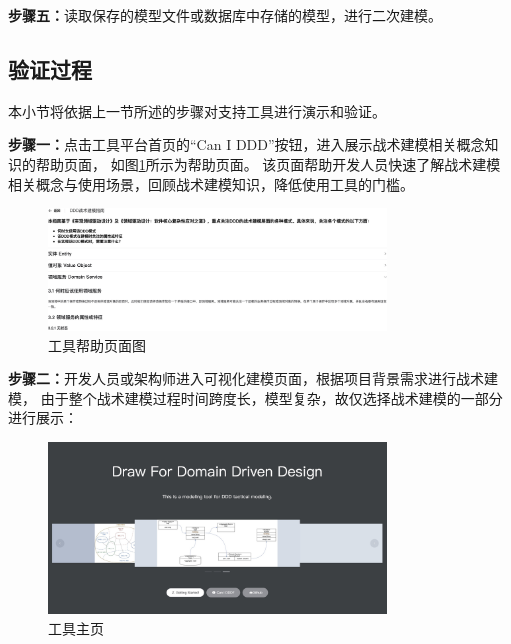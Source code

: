 \textbf{步骤五：}读取保存的模型文件或数据库中存储的模型，进行二次建模。

\subsection{验证过程}

本小节将依据上一节所述的步骤对支持工具进行演示和验证。

\textbf{步骤一：}点击工具平台首页的“Can I DDD”按钮，进入展示战术建模相关概念知识的帮助页面，
如图\ref{modelknowledge}所示为帮助页面。
该页面帮助开发人员快速了解战术建模相关概念与使用场景，回顾战术建模知识，降低使用工具的门槛。

\begin{figure}[!htbp] %
    \centering %
    \includegraphics[width=0.8\textwidth]{FIGs/chapter5/modelknowledge.png} %
    \caption{工具帮助页面图} %
    \label{modelknowledge} %
\end{figure}%

\textbf{步骤二：}开发人员或架构师进入可视化建模页面，根据项目背景需求进行战术建模，
由于整个战术建模过程时间跨度长，模型复杂，故仅选择战术建模的一部分进行展示：

\begin{figure}[!htbp] %
    \centering %
    \includegraphics[width=0.8\textwidth]{FIGs/chapter5/toolhome.png} %
    \caption{工具主页} %
    \label{toolhome} %
\end{figure}%



